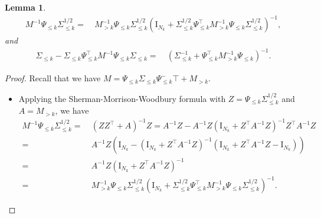 \documentclass{article}
\theoremstyle{plain}
\newtheorem{lemma}[theorem]{Lemma}
\theoremstyle{definition}
\theoremstyle{remark}
\begin{document}
\begin{appendix}
\begin{lemma}
\begin{equation*}
    \begin{aligned}
        M^{-1} \Psi_{\leq k} \Sigma_{\leq k}^{1/2} 
        = &~ 
        M_{>k}^{-1} \Psi_{\leq k} \Sigma_{\leq k}^{1/2} \left( \mathrm{I}_{N_{k}} +  \Sigma_{\leq k}^{1/2}  \Psi_{\leq k}^{\top} M_{>k}^{-1} \Psi_{\leq k} \Sigma_{\leq k}^{1/2}\right)^{-1}, 
    \end{aligned}
\end{equation*}
and 
\begin{equation*}
    \begin{aligned}
    \Sigma_{\leq k} - \Sigma_{\leq k} \Psi^{\top}_{\leq k} M^{-1} \Psi_{\leq k}\Sigma_{\leq k}
        = &~
        \left( \Sigma_{\leq k}^{-1} + \Psi_{\leq k}^{\top} M_{>k}^{-1} \Psi_{\leq k}  \right)^{-1}.
    \end{aligned}
\end{equation*}
        
\end{lemma}
\begin{proof}
Recall that we have $M = \Psi_{\leq k} \Sigma_{\leq k} \Psi_{\leq k}^-{\top} + M_{>k}$. 
\begin{itemize}
    \item Applying the Sherman-Morrison-Woodbury formula with $Z= \Psi_{\leq k} \Sigma_{\leq k}^{1/2}$ and $A=M_{>k}$, we have
    \begin{equation*}
    \begin{aligned}
        M^{-1} \Psi_{\leq k} \Sigma_{\leq k}^{1/2} 
        = &~  (ZZ^{\top} + A)^{-1} Z
        = A^{-1}Z - A^{-1} Z(\mathrm{I}_{N_{k}} + Z^{\top} A^{-1} Z)^{-1} Z^{\top} A^{-1}Z\\
        =&~
        A^{-1}Z \left(\mathrm{I}_{N_{k}} - (\mathrm{I}_{N_{k}} + Z^{\top} A^{-1} Z)^{-1} \left(\mathrm{I}_{N_{k}} + Z^{\top} A^{-1} Z - \mathrm{I}_{N_{k}}\right)\right)
        \\
        =&~
        A^{-1} Z \left( \mathrm{I}_{N_{k}} +  Z^{\top} A^{-1} Z\right)^{-1}
        \\
        =&~
        M_{>k}^{-1} \Psi_{\leq k} \Sigma_{\leq k}^{1/2} \left( \mathrm{I}_{N_{k}} +  \Sigma_{\leq k}^{1/2}  \Psi_{\leq k}^{\top} M_{>k}^{-1} \Psi_{\leq k} \Sigma_{\leq k}^{1/2}\right)^{-1}.
    \end{aligned}
\end{equation*}


\end{itemize}
\end{proof}
\end{appendix}
\end{document}
